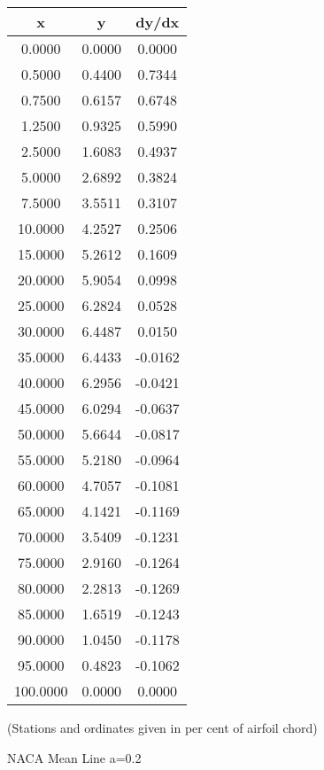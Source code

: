 \documentclass[11pt]{book}
\begin{document}
 \vspace{8mm}
 \begin{tabular}{|c|c|c|}  \hline
 x & y & dy/dx \\
 \hline
0.0000 & 0.0000 & 0.0000 \\
0.5000 & 0.4400 & 0.7344 \\
0.7500 & 0.6157 & 0.6748 \\
1.2500 & 0.9325 & 0.5990 \\
2.5000 & 1.6083 & 0.4937 \\
5.0000 & 2.6892 & 0.3824 \\
7.5000 & 3.5511 & 0.3107 \\
10.0000 & 4.2527 & 0.2506 \\
15.0000 & 5.2612 & 0.1609 \\
20.0000 & 5.9054 & 0.0998 \\
25.0000 & 6.2824 & 0.0528 \\
30.0000 & 6.4487 & 0.0150 \\
35.0000 & 6.4433 & -0.0162 \\
40.0000 & 6.2956 & -0.0421 \\
45.0000 & 6.0294 & -0.0637 \\
50.0000 & 5.6644 & -0.0817 \\
55.0000 & 5.2180 & -0.0964 \\
60.0000 & 4.7057 & -0.1081 \\
65.0000 & 4.1421 & -0.1169 \\
70.0000 & 3.5409 & -0.1231 \\
75.0000 & 2.9160 & -0.1264 \\
80.0000 & 2.2813 & -0.1269 \\
85.0000 & 1.6519 & -0.1243 \\
90.0000 & 1.0450 & -0.1178 \\
95.0000 & 0.4823 & -0.1062 \\
100.0000 & 0.0000 & 0.0000 \\
 \hline
 \end{tabular}
 \vspace{8mm}

(Stations and ordinates given in per cent of airfoil chord)

 \newpage
 \label{mla=0.2}
 \begin{Large}
 NACA Mean Line a=0.2
 \end{Large}
  
\end{document}
